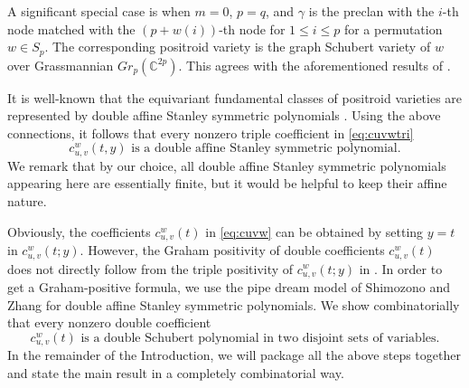 \documentclass[12pt,reqno]{amsart}
\numberwithin{equation}{section}
\theoremstyle{definition}
\begin{document}
A significant special case is when 
$m=0$, $p=q$, and $\gamma$ is the preclan with the $i$-th node matched with the $(p+w(i))$-th node for $1\leq i\leq p$ for a permutation $w\in S_p$. 
The corresponding positroid variety is the graph Schubert variety of $w$ over Grassmannian $Gr_p(\mathbb{C}^{2p})$. 
This agrees with the aforementioned results of \cite{WE}. 


It is well-known that the equivariant fundamental classes of positroid varieties are represented by double affine Stanley symmetric polynomials \cite{KLS,LLS18}. 
Using the above connections, it follows that every nonzero triple coefficient in \eqref{eq:cuvwtri}
$$
c_{u,v}^w(t, y)
\text{ is a double affine Stanley symmetric polynomial}.
$$
We remark that by our choice, all double affine Stanley symmetric polynomials appearing here are essentially finite, but it would be helpful to keep their affine nature. 


Obviously, the coefficients $c_{u,v}^w(t)$ in \eqref{eq:cuvw} can be obtained by setting $y=t$ in $c_{u,v}^w(t;y)$. 
However, the Graham positivity \cite{Graham01}  of double coefficients $c_{u,v}^w(t)$ does not directly follow from the triple positivity of $c_{u,v}^w(t;y)$ in \cite{Sam24,Gaox}. 
In order to get a Graham-positive formula, we  use the pipe dream model of Shimozono and Zhang \cite{SZ} for  double affine Stanley symmetric polynomials. 
We show combinatorially that  every nonzero double coefficient 
$$c_{u,v}^w(t)  
\text{ is a double Schubert polynomial in two disjoint sets of variables.
}
$$
In the remainder of the Introduction, we will package all the above steps together and state the main result in a completely combinatorial way. 
\end{document}
